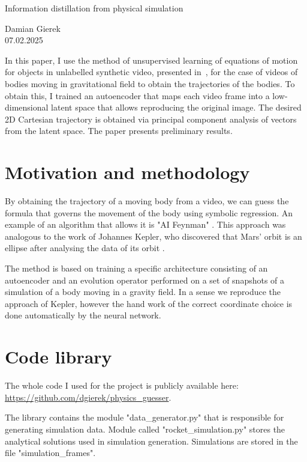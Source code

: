 \documentclass[12pt,letterpaper]{article}
\newcommand{\nid}{\noindent}
\begin{document}
\begin{center}
    \begin{huge}
     Information distillation from physical simulation\\[12pt]
    \end{huge}
    Damian Gierek\\
    \vspace{0.1em}
    07.02.2025
\end{center}

\hspace{0.3em}

\nid In this paper, I use the method of unsupervised learning of equations of motion for objects in unlabelled synthetic video, presented in~\cite{Udrescu2021}, for the case of videos of bodies moving in gravitational field to obtain the trajectories of the bodies. To obtain this, I trained an autoencoder that maps each video frame into a low-dimensional latent space that allows reproducing the original image. The desired 2D Cartesian trajectory is obtained via principal component analysis of vectors from the latent space. The paper presents preliminary results.

\section{Motivation and methodology}

By obtaining the trajectory of a moving body from a video, we can guess the formula that governs the movement of the body using symbolic regression. An example of an algorithm that allows it is "AI Feynman" \cite{udrescu2020}. This approach was analogous to the work of Johannes Kepler, who discovered that Mars' orbit is an ellipse after analysing the data of its orbit \cite{koyre2013}. 

The method is based on training a specific architecture consisting of an autoencoder and an evolution operator performed on a set of snapshots of a simulation of a body moving in a gravity field. In a sense we reproduce the approach of Kepler, however the hand work of the correct coordinate choice is done automatically by the neural network.

\section{Code library}
The whole code I used for the project is publicly available here: \url{https://github.com/dgierek/physics_guesser}. 

The library contains the module "data\_generator.py" that is responsible for generating simulation data. Module called "rocket\_simulation.py" stores the analytical solutions used in simulation generation. Simulations are stored in the file "simulation\_frames".
\end{document}

